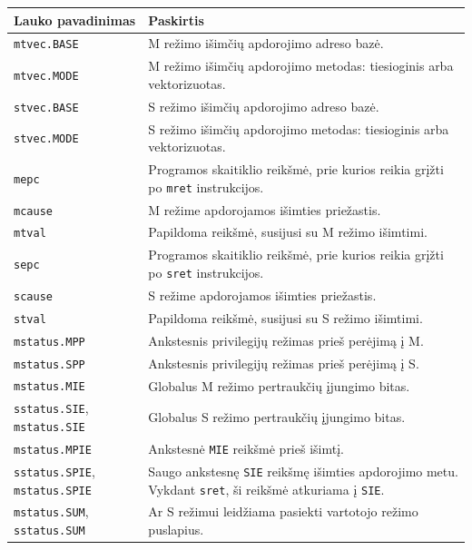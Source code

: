 \begin{longtable}{|p{}|p{}|}
    \hline
    \textbf{Lauko pavadinimas} & \textbf{Paskirtis} \\
    \hline

    \texttt{mtvec.BASE} & M režimo išimčių apdorojimo adreso bazė. \\
    \hline
    \texttt{mtvec.MODE} & M režimo išimčių apdorojimo metodas: tiesioginis arba vektorizuotas. \\
    \hline
    \texttt{stvec.BASE} & S režimo išimčių apdorojimo adreso bazė. \\
    \hline
    \texttt{stvec.MODE} & S režimo išimčių apdorojimo metodas: tiesioginis arba vektorizuotas. \\
    \hline

    \texttt{mepc} & Programos skaitiklio reikšmė, prie kurios reikia grįžti po \texttt{mret} instrukcijos. \\
    \hline
    \texttt{mcause} & M režime apdorojamos išimties priežastis. \\
    \hline
    \texttt{mtval} & Papildoma reikšmė, susijusi su M režimo išimtimi. \\
    \hline
    \texttt{sepc} & Programos skaitiklio reikšmė, prie kurios reikia grįžti po \texttt{sret} instrukcijos.  \\
    \hline
    \texttt{scause} & S režime apdorojamos išimties priežastis. \\
    \hline
    \texttt{stval} & Papildoma reikšmė, susijusi su S režimo išimtimi. \\
    \hline
    \texttt{mstatus.MPP} & Ankstesnis privilegijų režimas prieš perėjimą į M. \\
    \hline
    \texttt{mstatus.SPP} & Ankstesnis privilegijų režimas prieš perėjimą į S. \\
    \hline
    \texttt{mstatus.MIE} & Globalus M režimo pertraukčių įjungimo bitas. \\
    \hline
    \texttt{sstatus.SIE}, \texttt{mstatus.SIE} & Globalus S režimo pertraukčių įjungimo bitas. \\
    \hline
    \texttt{mstatus.MPIE} & Ankstesnė \texttt{MIE} reikšmė prieš išimtį. \\
    \hline
    \texttt{sstatus.SPIE}, \texttt{mstatus.SPIE} & Saugo ankstesnę \texttt{SIE} reikšmę išimties apdorojimo metu. Vykdant \texttt{sret}, ši reikšmė atkuriama į \texttt{SIE}. \\
    \hline
    \texttt{mstatus.SUM}, \texttt{sstatus.SUM} & Ar S režimui leidžiama pasiekti vartotojo režimo puslapius. \\

\end{longtable}
